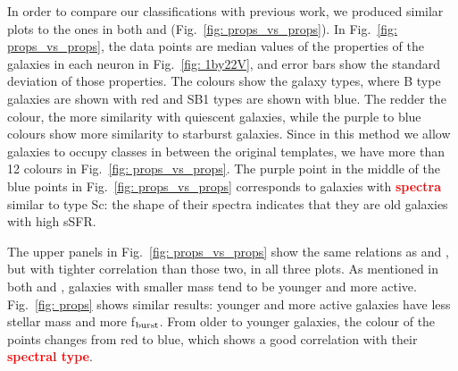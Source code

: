         In order to compare our classifications with previous work, we produced similar plots to the ones in both  and  (Fig.~\ref{fig: props_vs_props}).
        In Fig.~\ref{fig: props_vs_props}, the data points are median values of the properties of the galaxies in each neuron in Fig.~\ref{fig: 1by22V}, and error bars show the standard deviation of those properties.
        The colours show the galaxy types, where B type galaxies are shown with red and SB1 types are shown with blue.
        The redder the colour, the more similarity with quiescent galaxies, while the purple to blue colours show more similarity to starburst galaxies.
        Since in this method we allow galaxies to occupy classes in between the original  templates, we have more than 12 colours in Fig.~\ref{fig: props_vs_props}.
        The purple point in the middle of the blue points in Fig.~\ref{fig: props_vs_props} corresponds to galaxies with \textbf{\textcolor{red}{spectra}} similar to type Sc: the shape of their spectra indicates that they are old galaxies with high sSFR.
        
        The upper panels in Fig.~\ref{fig: props_vs_props} show the same relations as  and , but with tighter correlation than those two, in all three plots.
        As mentioned in both  and , galaxies with smaller mass tend to be younger and more active.
        Fig.~\ref{fig: props} shows similar results: younger and more active galaxies have less stellar mass and more f$_{\rm {burst}}$.
        From older to younger galaxies, the colour of the points changes from red to blue, which shows a good correlation with their \textbf{\textcolor{red}{spectral type}}.
        

